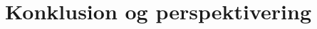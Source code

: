 \documentclass[../SRP.tex]{subfiles}
\begin{document}
\chapter{Konklusion og perspektivering}
\end{document}

